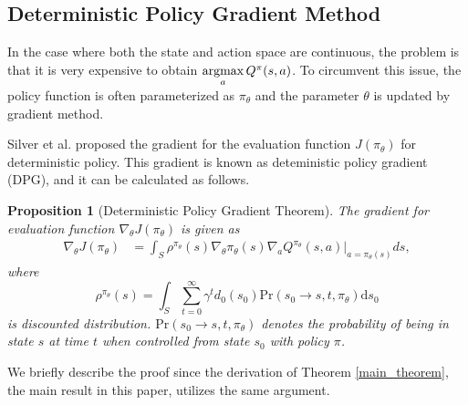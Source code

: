 \documentclass[english, dvipdfmx]{ampmt}             %
\newcommand{\argmax}{\mathop{\rm argmax}\limits}
\newtheorem{prop.}{Proposition}
\begin{document}
\subsection{Deterministic Policy Gradient Method}
In the case where both the state and action space are continuous, the problem is that it is very expensive to obtain $\argmax_aQ^{\pi}(s,a)$. To circumvent this issue, the policy function is often parameterized as $\pi_{\theta}$ and the parameter $\theta$ is updated by gradient method. \par
Silver et al. \cite{DPG} proposed the gradient for the evaluation function $J(\pi_{\theta})$ for deterministic policy. This gradient is known as deteministic policy gradient (DPG), and it can be calculated as follows.
\begin{prop.}[Deterministic Policy Gradient Theorem]
The gradient for evaluation function $\nabla_{\theta}J(\pi_{\theta})$ is given as 
\begin{align}
	\nabla_{\theta}J(\pi_{\theta}) &= \int_S\rho^{\pi_{\theta}}(s)
	\nabla_{\theta}\pi_{\theta}(s)\nabla_{a}Q^{\pi_{\theta}}(s, a)|_{a=\pi_{\theta}(s)}ds \label{true_pg} ,
\end{align}
where
\begin{equation}
	\rho^{\pi_{\theta}}(s) = \int_{S}\sum_{t=0}^{\infty}\gamma^td_0(s_0)\textrm{Pr}(s_0\to s, t,  \pi_{\theta})\textrm{d}s_0
\end{equation}
is discounted distribution. $\textrm{Pr}(s_0\to s, t,  \pi_{\theta})$ denotes the probability of being in state $s$ at time $t$ when controlled from state $s_0$ with policy $\pi$.
\end{prop.}
We briefly describe the proof since the derivation of Theorem \ref{main_theorem}, the main result in this paper, utilizes the same argument.
\end{document}
